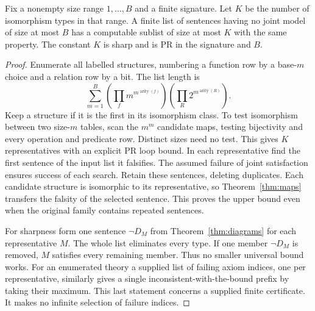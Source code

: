 \begin{theorem}\label{thm:boundedcover}
Fix a nonempty size range $1,\ldots,B$ and a finite signature. Let $K$ be the number of isomorphism types in that range. A finite list of sentences having no joint model of size at most $B$ has a computable sublist of size at most $K$ with the same property. The constant $K$ is sharp and is PR in the signature and $B$.
\end{theorem}
\begin{proof}
Enumerate all labelled structures, numbering a function row by a base-$m$ choice and a relation row by a bit. The list length is
\[
 \sum_{m=1}^B
  \left(\prod_f m^{m^{\operatorname{arity}(f)}}\right)
  \left(\prod_R 2^{m^{\operatorname{arity}(R)}}\right).
\]
Keep a structure if it is the first in its isomorphism class. To test isomorphism between two size-$m$ tables, scan the $m^m$ candidate maps, testing bijectivity and every operation and predicate row. Distinct sizes need no test. This gives $K$ representatives with an explicit PR loop bound. In each representative find the first sentence of the input list it falsifies. The assumed failure of joint satisfaction ensures success of each search. Retain these sentences, deleting duplicates. Each candidate structure is isomorphic to its representative, so Theorem~\ref{thm:maps} transfers the falsity of the selected sentence. This proves the upper bound even when the original family contains repeated sentences.

For sharpness form one sentence $\neg D_M$ from Theorem~\ref{thm:diagrams} for each representative $M$. The whole list eliminates every type. If one member $\neg D_M$ is removed, $M$ satisfies every remaining member. Thus no smaller universal bound works. For an enumerated theory a supplied list of failing axiom indices, one per representative, similarly gives a single inconsistent-with-the-bound prefix by taking their maximum. This last statement concerns a supplied finite certificate. It makes no infinite selection of failure indices.
\end{proof}


